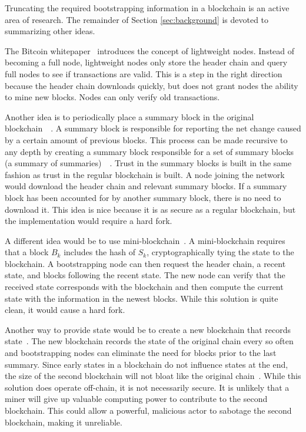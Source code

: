 Truncating the required bootstrapping information in a blockchain is an active area of research.
The remainder of Section \ref{sec:background} is devoted to summarizing other ideas.


The Bitcoin whitepaper~\cite{nakamoto2009Bitcoin} introduces the concept of lightweight nodes.
Instead of becoming a full node, lightweight nodes only store the header chain and query full nodes to see if transactions are valid.
This is a step in the right direction because the header chain downloads quickly, but does not grant nodes the ability to mine new blocks.
Nodes can only verify old transactions.


Another idea is to periodically place a summary block in the original blockchain~\cite{palai2018BlockSummariesSameChain}~\cite{nadiya2018BlockSummaries(ExtendsPalai)}.
A summary block is responsible for reporting the net change caused by a certain amount of previous blocks.
This process can be made recursive to any depth by creating a summary block responsible for a set of summary blocks (a summary of summaries)~\cite{palai2018BlockSummariesSameChain}~\cite{nadiya2018BlockSummaries(ExtendsPalai)}.
Trust in the summary blocks is built in the same fashion as trust in the regular blockchain is built.
A node joining the network would download the header chain and relevant summary blocks.
If a summary block has been accounted for by another summary block, there is no need to download it.
This idea is nice because it is as secure as a regular blockchain, but the implementation would require a hard fork.


A different idea would be to use mini-blockchain~\cite{bruce2014Miniblockchain}.
A mini-blockchain requires that a block $B_k$ includes the hash of $S_k$, cryptographically tying the state to the blockchain.
A bootstrapping node can then request the header chain, a recent state, and blocks following the recent state.
The new node can verify that the received state corresponds with the blockchain and then compute the current state with the information in the newest blocks.
While this solution is quite clean, it would cause a hard fork.


Another way to provide state would be to create a new blockchain that records state~\cite{marsalek2019BockSummariesSeparateChain}.
The new blockchain records the state of the original chain every so often and bootstrapping nodes can eliminate the need for blocks prior to the last summary.
Since early states in a blockchain do not influence states at the end, the size of the second blockchain will not bloat like the original chain~\cite{marsalek2019BockSummariesSeparateChain}.
While this solution does operate off-chain, it is not necessarily secure.
It is unlikely that a miner will give up valuable computing power to contribute to the second blockchain.
This could allow a powerful, malicious actor to sabotage the second blockchain, making it unreliable.

